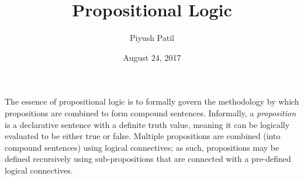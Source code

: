 \documentclass{article}
\begin{document}
\newcommand{\N}{\mathbb{N}}
\newcommand{\Z}{\mathbb{Z}}
\newcommand{\Q}{\mathbb{Q}}
\newcommand{\R}{\mathbb{R}}
\newcommand{\T}{\text{\normalfont\ T}}
\newcommand{\F}{\text{\normalfont\ F}}
\newcommand{\ti}{\textit}
\newcommand{\tb}{\textbf}
\newcommand{\n}{\leavevmode \newline}
\newcommand{\nn}{\leavevmode \newline \newline}
\def \Def#1#2{\begin{adjustwidth}{0.85cm}{0.85cm} \tb{(Definition) #1}: \ti{#2} \end{adjustwidth}}
\def \nDef#1#2{\n \Def{#1}{#2}}
\def \Defn#1#2{\Def{#1}{#2} \n}
\def \nDefn#1#2{\n \Defn{#1}{#2}}
\def \Defcont#1{\begin{adjustwidth}{0.85cm}{0.85cm} \ti{#1} \end{adjustwidth} \n}
\def \InDef#1{\ti{\begin{adjustwidth}{0.85cm}{0.85cm} #1 \end{adjustwidth}}}
\def \Thm#1#2{\begin{adjustwidth}{0.85cm}{0.85cm} \tb{(Theorem) #1}: \ti{#2} \end{adjustwidth}}
\def \nThm#1#2{\n \Thm{#1}{#2}}
\def \Thmn#1#2{\Thm{#1}{#2} \n}
\def \nThmn#1#2{\n \Thmn{#1}{#2}}
\def \InThm#1{\ti{\begin{adjustwidth}{0.85cm}{0.85cm} #1 \end{adjustwidth}}}
\def \Pf#1{\begin{adjustwidth}{0.85cm}{0.85cm} \textit{Proof}: #1 \qedsymbol \end{adjustwidth} \nn}
\newcommand{\st}{\textnormal{ s.t. }}
\newcommand{\proplang}{\mathcal{L}_0}

\title{Propositional Logic}
\author{Piyush Patil}
\date{August 24, 2017}
\maketitle

The essence of propositional logic is to formally govern the methodology by which propositions are combined to form compound sentences. Informally, a \ti{proposition} is a declarative sentence with a definite truth value, meaning it can be logically evaluated to be either true or false. Multiple propositions are combined (into compound sentences) using logical connectives; as such, propositions may be defined recursively using sub-propositions that are connected with a pre-defined logical connectives.
\end{document}
